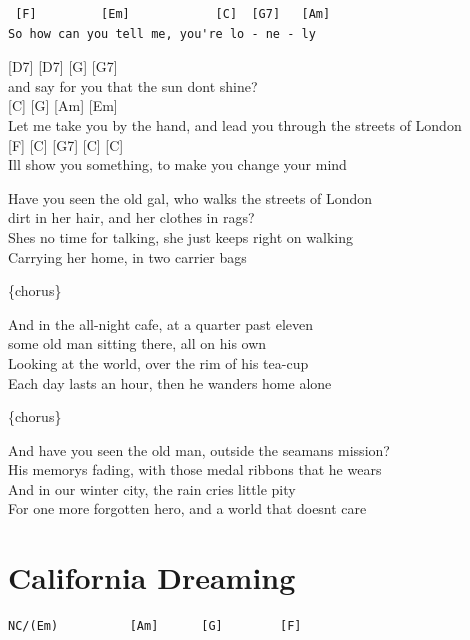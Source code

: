 \documentclass[
  letterpaper,
]{scrbook}
\begin{document}
\begin{verbatim}
 [F]         [Em]            [C]  [G7]   [Am]
So how can you tell me, you're lo - ne - ly
\end{verbatim}

{[}D7{]} {[}D7{]} {[}G{]} {[}G7{]}\\
and say for you that the sun don\textquotesingle t shine?\\
{[}C{]} {[}G{]} {[}Am{]} {[}Em{]}\\
Let me take you by the hand, and lead you through the streets of
London\\
{[}F{]} {[}C{]} {[}G7{]} {[}C{]} {[}C{]}\\
I\textquotesingle ll show you something, to make you change your mind

Have you seen the old gal, who walks the streets of London\\
dirt in her hair, and her clothes in rags?\\
She\textquotesingle s no time for talking, she just keeps right on
walking\\
Carrying her home, in two carrier bags

\{chorus\}

And in the all-night cafe, at a quarter past eleven\\
some old man sitting there, all on his own\\
Looking at the world, over the rim of his tea-cup\\
Each day lasts an hour, then he wanders home alone

\{chorus\}

And have you seen the old man, outside the seaman\textquotesingle s
mission?\\
His memory\textquotesingle s fading, with those medal ribbons that he
wears\\
And in our winter city, the rain cries little pity\\
For one more forgotten hero, and a world that doesn\textquotesingle t
care

\hypertarget{california-dreaming}{%
\chapter{California Dreaming}\label{california-dreaming}}

\begin{verbatim}
NC/(Em)          [Am]      [G]        [F]
\end{verbatim}
\end{document}
